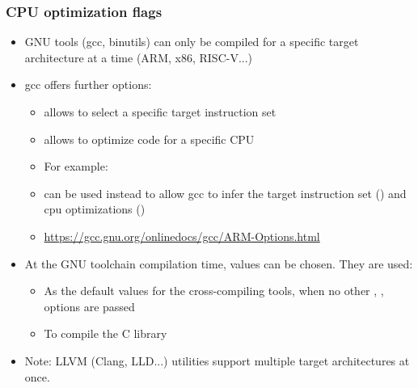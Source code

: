 \begin{frame}
  \frametitle{CPU optimization flags}
  \begin{itemize}
  \item GNU tools (gcc, binutils) can only be compiled for a specific
        target architecture at a time (ARM, x86, RISC-V...)
  \item gcc offers further options:
    \begin{itemize}
    \item {} allows to select a specific target instruction set
    \item {} allows to optimize code for a specific CPU
    \item For example: 
    \item {} can be used instead to allow gcc to infer the target
      instruction set () and cpu optimizations ()
    \item \url{https://gcc.gnu.org/onlinedocs/gcc/ARM-Options.html}
    \end{itemize}
  \item At the GNU toolchain compilation time, values can be chosen. They are used:
    \begin{itemize}
    \item As the default values for the cross-compiling tools, when no
      other , ,  options are
      passed
    \item To compile the C library
    \end{itemize}
  \item Note: LLVM (Clang, LLD...) utilities support multiple target architectures at once.
  \end{itemize}
\end{frame}
